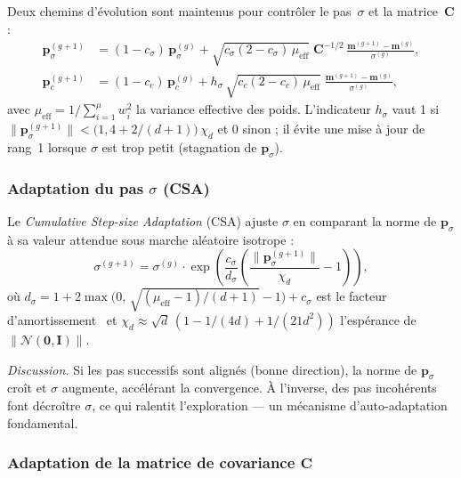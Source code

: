 Deux chemins d'évolution sont maintenus pour contrôler le pas~$\sigma$ et la
matrice~$\mathbf{C}$ :
\begin{align}
  \mathbf{p}_\sigma^{(g+1)} &= (1 - c_\sigma)\,\mathbf{p}_\sigma^{(g)}
    + \sqrt{c_\sigma(2 - c_\sigma)\,\mu_{\text{eff}}}\;
      \mathbf{C}^{-1/2}\,\frac{\mathbf{m}^{(g+1)} - \mathbf{m}^{(g)}}{\sigma^{(g)}},
    \label{eq:ps} \\
  \mathbf{p}_c^{(g+1)} &= (1 - c_c)\,\mathbf{p}_c^{(g)}
    + h_\sigma\,\sqrt{c_c(2 - c_c)\,\mu_{\text{eff}}}\;
      \frac{\mathbf{m}^{(g+1)} - \mathbf{m}^{(g)}}{\sigma^{(g)}},
    \label{eq:pc}
\end{align}
avec $\mu_{\text{eff}} = 1/\sum_{i=1}^{\mu} w_i^2$ la variance effective des
poids.  L'indicateur $h_\sigma$ vaut 1 si
$\|\mathbf{p}_\sigma^{(g+1)}\| < \bigl(1{,}4 + 2/(d+1)\bigr)\,\chi_d$ et 0
sinon ; il évite une mise à jour de rang~1 lorsque $\sigma$ est trop petit
(stagnation de $\mathbf{p}_\sigma$).

\subsubsection{Adaptation du pas $\sigma$ (CSA)}

Le \textit{Cumulative Step-size Adaptation} (CSA) ajuste $\sigma$ en comparant
la norme de $\mathbf{p}_\sigma$ à sa valeur attendue sous marche aléatoire
isotrope :
\begin{equation}
\label{eq:sigma-update}
  \sigma^{(g+1)} = \sigma^{(g)} \cdot
  \exp\!\left(\frac{c_\sigma}{d_\sigma}
    \left(\frac{\|\mathbf{p}_\sigma^{(g+1)}\|}{\chi_d} - 1\right)\right),
\end{equation}
où $d_\sigma = 1 + 2\max\!\bigl(0,\,\sqrt{(\mu_{\text{eff}}-1)/(d+1)} -
1\bigr) + c_\sigma$ est le facteur d'amortissement~\cite{hansen2001} et
$\chi_d \approx \sqrt{d}\,(1 - 1/(4d) + 1/(21 d^2))$ l'espérance de
$\|\mathcal{N}(\mathbf{0}, \mathbf{I})\|$.

\emph{Discussion.}  Si les pas successifs sont alignés (bonne direction), la
norme de $\mathbf{p}_\sigma$ croît et $\sigma$ augmente, accélérant la
convergence.  À l'inverse, des pas incohérents font décroître $\sigma$, ce qui
ralentit l'exploration --- un mécanisme d'auto-adaptation fondamental.

\subsubsection{Adaptation de la matrice de covariance $\mathbf{C}$}

